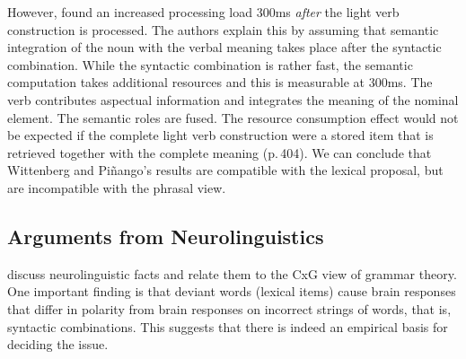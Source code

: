 \begin{exe}
\begin{xlist}[iv.]
\begin{exe}
\begin{xlist}[iv.]
However, \citet{WP2011a} found an increased processing load 300ms \emph{after} the light verb construction is
processed. The authors explain this by assuming that semantic integration of the noun with the
verbal meaning takes place after the syntactic
combination. While the syntactic combination is rather fast, the semantic computation takes
additional resources and this is measurable at 300ms. The verb contributes aspectual information and integrates
the meaning of the nominal element. The semantic roles are fused. The resource consumption effect
would not be expected if the complete light verb construction were a stored item that is
retrieved together with the complete meaning (p.\,404). We can conclude that Wittenberg and
Piñango's results are compatible with the lexical proposal, but are
incompatible with the phrasal view. %


\subsection{Arguments from Neurolinguistics}
\label{sec-neuro-linguistics}


\mbox{}\citet*{PCShandbookCxG} discuss neurolinguistic facts and relate them to the CxG view of grammar
theory. One important finding is that deviant words (lexical items) cause brain responses that differ in polarity
from brain responses on incorrect strings of words, that is, syntactic combinations. This suggests
that there is indeed an empirical basis for deciding the issue.


\end{xlist}
\end{exe}
\end{xlist}
\end{exe}
